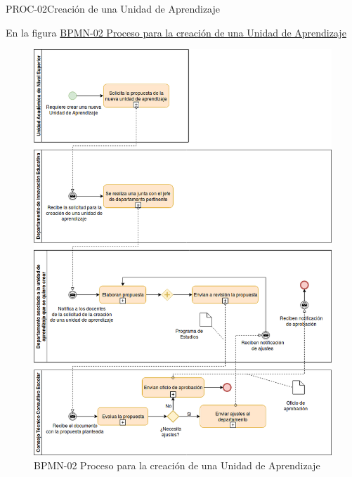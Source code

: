 \begin{BPMN}{PROC-02}{Creación de una Unidad de Aprendizaje}{}
\end{BPMN}
En la figura \hyperref[fig:BPMN-02]{BPMN-02 Proceso para la creación de una Unidad de Aprendizaje}

\begin{figure}[htbp]
	\begin{center}
		\includegraphics[width=.80\textwidth]{C1-DP/SP1/IG-SP1/BPMN-02}
		\caption{BPMN-02 Proceso para la creación de una Unidad de Aprendizaje}
		\label{fig:BPMN-02}
	\end{center}
\end{figure}
